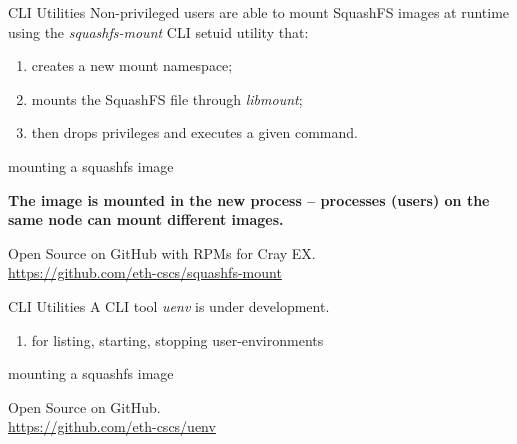 \documentclass[aspectratio=43]{beamer}
\begin{document}
\begin{frame}[fragile]{CLI Utilities}
    Non-privileged users are able to mount SquashFS images at runtime using the \emph{squashfs-mount} CLI setuid utility that:
    \begin{enumerate}
    \item creates a new mount namespace;
    \item mounts the SquashFS file through \emph{libmount};
    \item then drops privileges and executes a given command.
    \end{enumerate}

    \begin{code}{mounting a squashfs image}

    \end{code}

    \begin{center}
        \textbf{The image is mounted in the new process -- processes (users) on the same node can mount different images.}
    \end{center}

    \vspace{10pt}

    Open Source on GitHub with RPMs for Cray EX.\\\url{https://github.com/eth-cscs/squashfs-mount}
\end{frame}

\begin{frame}[fragile]{CLI Utilities}
    A CLI tool \emph{uenv} is under development.
    \begin{enumerate}
    \item for listing, starting, stopping user-environments
    \end{enumerate}

    \begin{code}{mounting a squashfs image}

    \end{code}

    \vspace{10pt}

    Open Source on GitHub.\\\url{https://github.com/eth-cscs/uenv}
\end{frame}
\end{document}
